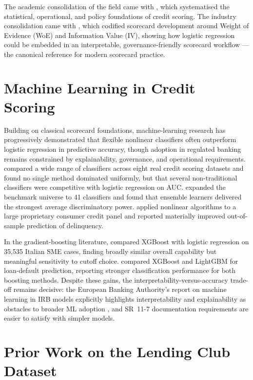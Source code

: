 \documentclass[12pt,a4paper]{report}
\begin{document}
The academic consolidation of the field came with \citet{thomas2002}, which systematised the statistical, operational, and policy foundations of credit scoring. The industry consolidation came with \citet{siddiqi2006}, which codified scorecard development around Weight of Evidence (WoE) and Information Value (IV), showing how logistic regression could be embedded in an interpretable, governance-friendly scorecard workflow --- the canonical reference for modern scorecard practice.

\section{Machine Learning in Credit Scoring}
\label{sec:ml}

Building on classical scorecard foundations, machine-learning research has progressively demonstrated that flexible nonlinear classifiers often outperform logistic regression in predictive accuracy, though adoption in regulated banking remains constrained by explainability, governance, and operational requirements. \citet{baesens2003} compared a wide range of classifiers across eight real credit scoring datasets and found no single method dominated uniformly, but that several non-traditional classifiers were competitive with logistic regression on AUC. \citet{lessmann2015} expanded the benchmark universe to 41 classifiers and found that ensemble learners delivered the strongest average discriminatory power. \citet{khandani2010} applied nonlinear algorithms to a large proprietary consumer credit panel and reported materially improved out-of-sample prediction of delinquency.

In the gradient-boosting literature, \citet{zedda2024} compared XGBoost with logistic regression on 35,535 Italian SME cases, finding broadly similar overall capability but meaningful sensitivity to cutoff choice. \citet{dong2023} compared XGBoost and LightGBM for loan-default prediction, reporting stronger classification performance for both boosting methods. Despite these gains, the interpretability-versus-accuracy trade-off remains decisive: the European Banking Authority's report on machine learning in IRB models explicitly highlights interpretability and explainability as obstacles to broader ML adoption \cite{eba2023}, and SR~11-7 documentation requirements are easier to satisfy with simpler models.

\section{Prior Work on the Lending Club Dataset}
\label{sec:lendingclub}
\end{document}
